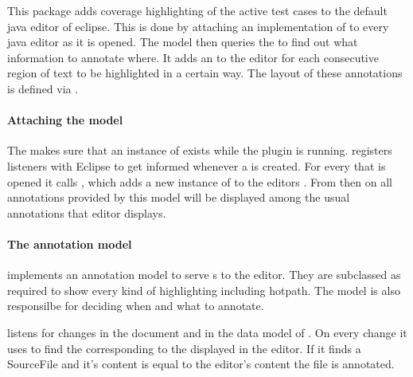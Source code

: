 This package adds coverage highlighting of the active test cases to the default
java editor of eclipse. This is done by attaching an implementation of
 to every java editor as it is opened. The model then
queries the  to find out what information to annotate
where. It adds an  to the editor
for each consecutive region of text to be highlighted in a certain way. The
layout of these annotations is defined via
.

\paragraph{Attaching the model}
The  makes sure that an instance of
\linebreak {} exists while the plugin is running. 
registers listeners with Eclipse to get informed whenever a
 is created. For every
 that is opened it calls
, which adds a new instance of
\linebreak{} to the editors
\linebreak{}. From then on
all annotations provided by this model will be displayed among the usual
annotations that editor displays.

\paragraph{The annotation model}
 implements an annotation model to serve \linebreak{}s
to the editor. They are subclassed as required to show every kind of highlighting including hotpath.
The model is also responsilbe for deciding when and what to annotate.

 listens for changes in the document and in the data model of
\gbt. On every change it uses 
\linebreak{} to find the corresponding  to the
displayed in the editor. If it finds a SourceFile and it's content is equal to the editor's content the file is annotated.

